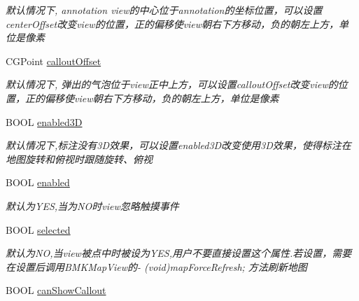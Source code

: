 \begin{DoxyCompactItemize}
\begin{DoxyCompactList}\small\item\em 默认情况下, annotation view的中心位于annotation的坐标位置，可以设置center\+Offset改变view的位置，正的偏移使view朝右下方移动，负的朝左上方，单位是像素 \end{DoxyCompactList}\item 
\hypertarget{interface_b_m_k_annotation_view_aacdcb492cbbc469803ba50def87f44e5}{}C\+G\+Point \hyperlink{interface_b_m_k_annotation_view_aacdcb492cbbc469803ba50def87f44e5}{callout\+Offset}\label{interface_b_m_k_annotation_view_aacdcb492cbbc469803ba50def87f44e5}

\begin{DoxyCompactList}\small\item\em 默认情况下, 弹出的气泡位于view正中上方，可以设置callout\+Offset改变view的位置，正的偏移使view朝右下方移动，负的朝左上方，单位是像素 \end{DoxyCompactList}\item 
\hypertarget{interface_b_m_k_annotation_view_a18cef771d9b9feeb74a4bc4dd7fba526}{}B\+O\+O\+L \hyperlink{interface_b_m_k_annotation_view_a18cef771d9b9feeb74a4bc4dd7fba526}{enabled3\+D}\label{interface_b_m_k_annotation_view_a18cef771d9b9feeb74a4bc4dd7fba526}

\begin{DoxyCompactList}\small\item\em 默认情况下,标注没有3\+D效果，可以设置enabled3\+D改变使用3\+D效果，使得标注在地图旋转和俯视时跟随旋转、俯视 \end{DoxyCompactList}\item 
\hypertarget{interface_b_m_k_annotation_view_ad768885a75146458b4efd168885478fe}{}B\+O\+O\+L \hyperlink{interface_b_m_k_annotation_view_ad768885a75146458b4efd168885478fe}{enabled}\label{interface_b_m_k_annotation_view_ad768885a75146458b4efd168885478fe}

\begin{DoxyCompactList}\small\item\em 默认为\+Y\+E\+S,当为\+N\+O时view忽略触摸事件 \end{DoxyCompactList}\item 
\hypertarget{interface_b_m_k_annotation_view_a09799664ef861651bd7996f0fbab6483}{}B\+O\+O\+L \hyperlink{interface_b_m_k_annotation_view_a09799664ef861651bd7996f0fbab6483}{selected}\label{interface_b_m_k_annotation_view_a09799664ef861651bd7996f0fbab6483}

\begin{DoxyCompactList}\small\item\em 默认为\+N\+O,当view被点中时被设为\+Y\+E\+S,用户不要直接设置这个属性.\+若设置，需要在设置后调用\+B\+M\+K\+Map\+View的-\/ (void)map\+Force\+Refresh; 方法刷新地图 \end{DoxyCompactList}\item 
\hypertarget{interface_b_m_k_annotation_view_adef94e946f5b152c59be1cdb5eccfb74}{}B\+O\+O\+L \hyperlink{interface_b_m_k_annotation_view_adef94e946f5b152c59be1cdb5eccfb74}{can\+Show\+Callout}\label{interface_b_m_k_annotation_view_adef94e946f5b152c59be1cdb5eccfb74}


\end{DoxyCompactItemize}
